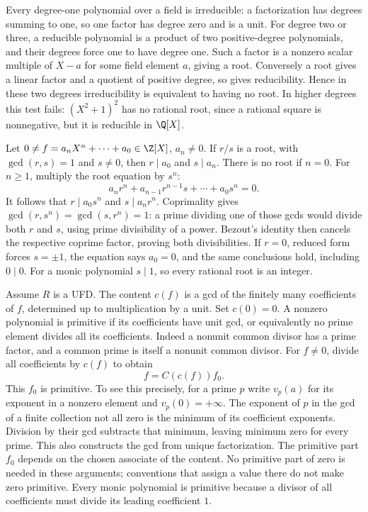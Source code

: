Every degree-one polynomial over a field is irreducible: a factorization
has degrees summing to one, so one factor has degree zero and is a unit.
For degree two or three, a reducible polynomial is a product of two
positive-degree polynomials, and their degrees force one to have degree
one. Such a factor is a nonzero scalar multiple of $X-a$ for some
field element $a$, giving a root. Conversely a root gives a linear
factor and a quotient of positive degree, so gives reducibility.
Hence in these two degrees irreducibility is equivalent to having no
root. In higher degrees this test fails: $(X^2+1)^2$ has no rational
root, since a rational square is nonnegative, but it is reducible in
$\Q[X]$.

Let $0\ne f=a_nX^n+\cdots+a_0\in\Z[X]$, $a_n\ne0$.
If $r/s$ is a root, with $\gcd(r,s)=1$ and $s\ne0$, then
$r\mid a_0$ and $s\mid a_n$.
There is no root if $n=0$. For $n\ge1$, multiply the root equation
by $s^n$:
\[
 a_nr^n+a_{n-1}r^{n-1}s+\cdots+a_0s^n=0.
\]
It follows that $r\mid a_0s^n$ and $s\mid a_nr^n$.
Coprimality gives $\gcd(r,s^n)=\gcd(s,r^n)=1$:
a prime dividing one of those gcds would divide both $r$ and $s$,
using prime divisibility of a power. Bezout's identity then cancels
the respective coprime factor, proving both divisibilities.
If $r=0$, reduced form forces $s=\pm1$, the equation says $a_0=0$,
and the same conclusions hold, including $0\mid0$.
For a monic polynomial $s\mid1$, so every rational root is an integer.

Assume $R$ is a UFD. The content $c(f)$ is a gcd of the finitely many
coefficients of $f$, determined up to multiplication by a unit.
Set $c(0)=0$. A nonzero polynomial is primitive if its coefficients
have unit gcd, or equivalently no prime element divides all its
coefficients. Indeed a nonunit common divisor has a prime factor,
and a common prime is itself a nonunit common divisor.
For $f\ne0$, divide all coefficients by $c(f)$ to obtain
\[
 f=C(c(f))f_0.
\]
This $f_0$ is primitive. To see this precisely, for a prime $p$ write
$v_p(a)$ for its exponent in a nonzero element and $v_p(0)=+\infty$.
The exponent of $p$ in the gcd of a finite collection not all zero is
the minimum of its coefficient exponents. Division by their gcd
subtracts that minimum, leaving minimum zero for every prime.
This also constructs the gcd from unique factorization.
The primitive part $f_0$ depends on the chosen associate of the content.
No primitive part of zero is needed in these arguments; conventions
that assign a value there do not make zero primitive.
Every monic polynomial is primitive because a divisor of all
coefficients must divide its leading coefficient $1$.

